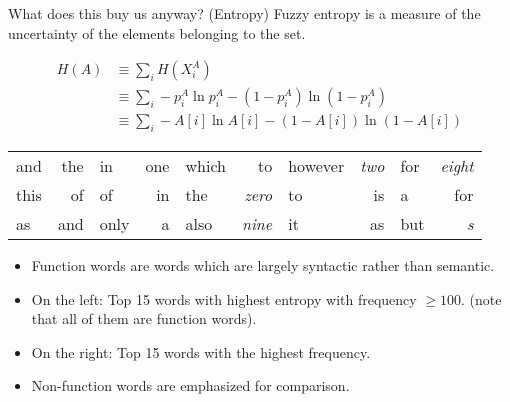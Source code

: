 \documentclass[8pt]{beamer}
\begin{document}
\begin{frame}{What does this buy us anyway? (Entropy)}
Fuzzy entropy is a measure of the uncertainty of the elements belonging to the set. \pause

\begin{align*} H(A) &\equiv \sum_i H(X^A_i) \\ &\equiv \sum_i
-p_i^A \ln p_i^A - (1 - p_i^A) \ln (1 - p_i^A) \\ &\equiv  \sum_i -A[i] \ln
A[i] - (1 - A[i]) \ln (1 - A[i])
\end{align*}


\begin{tabular}{l r | l r | l r | l r | l r}
and   & the   &   in    &   one         &   which     &   to          &   however &   \emph{two}  &   for     &   \emph{eight}  \\
this    & of    &   of      &   in          &   the       &   \emph{zero} &   to    &   is          &   a     &   for \\
as      & and   &   only  &   a           &   also      &   \emph{nine} &   it    &   as          &   but     &   \emph{s}
\end{tabular}

\begin{itemize}
\item Function words are words which are largely syntactic rather than semantic.
\item On the left: Top 15 words with highest entropy with frequency $\geq 100$. (note that all of them are function words).
\item On the right: Top 15 words with the highest frequency.
\item Non-function words are emphasized for comparison.
\end{itemize}

\end{frame}
\end{document}
